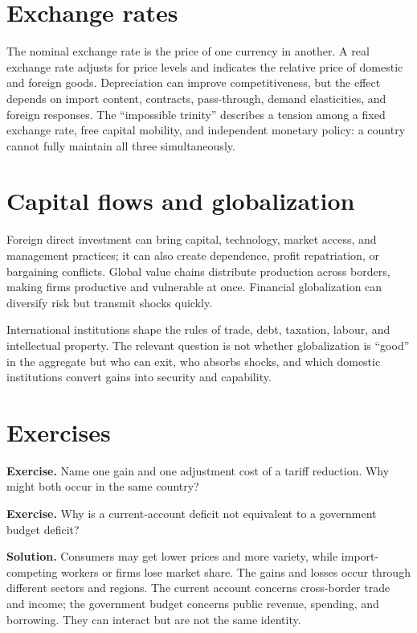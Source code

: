 \documentclass[11pt,oneside,openany]{book}
\newcommand{\exercise}[1]{\textbf{Exercise.} #1}
\newcommand{\solution}[1]{\textbf{Solution.} #1}
\begin{document}
\section{Exchange rates}

The nominal exchange rate is the price of one currency in another. A real exchange rate adjusts for price levels and indicates the relative price of domestic and foreign goods. Depreciation can improve competitiveness, but the effect depends on import content, contracts, pass-through, demand elasticities, and foreign responses. The ``impossible trinity'' describes a tension among a fixed exchange rate, free capital mobility, and independent monetary policy: a country cannot fully maintain all three simultaneously.

\section{Capital flows and globalization}

Foreign direct investment can bring capital, technology, market access, and management practices; it can also create dependence, profit repatriation, or bargaining conflicts. Global value chains distribute production across borders, making firms productive and vulnerable at once. Financial globalization can diversify risk but transmit shocks quickly.

International institutions shape the rules of trade, debt, taxation, labour, and intellectual property. The relevant question is not whether globalization is ``good'' in the aggregate but who can exit, who absorbs shocks, and which domestic institutions convert gains into security and capability.

\section{Exercises}

\exercise{Name one gain and one adjustment cost of a tariff reduction. Why might both occur in the same country?}

\exercise{Why is a current-account deficit not equivalent to a government budget deficit?}

\solution{Consumers may get lower prices and more variety, while import-competing workers or firms lose market share. The gains and losses occur through different sectors and regions. The current account concerns cross-border trade and income; the government budget concerns public revenue, spending, and borrowing. They can interact but are not the same identity.}
\end{document}
